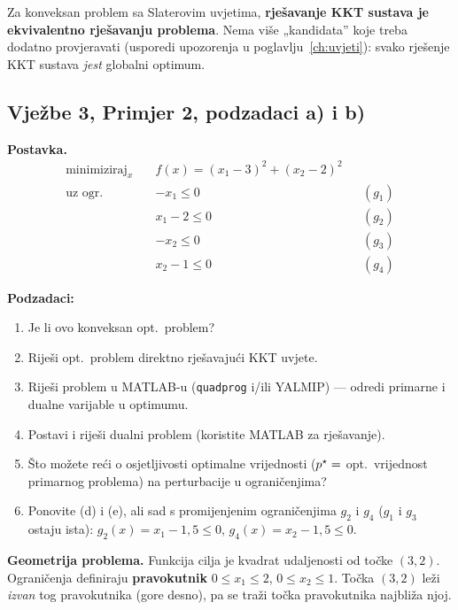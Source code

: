 \begin{napomena}
Za konveksan problem sa Slaterovim uvjetima, \textbf{rješavanje KKT sustava je
ekvivalentno rješavanju problema}. Nema više „kandidata” koje treba dodatno
provjeravati (usporedi upozorenja u poglavlju~\ref{ch:uvjeti}): svako rješenje
KKT sustava \emph{jest} globalni optimum.
\end{napomena}

\subsection{Vježbe 3, Primjer 2, podzadaci a) i b)}
\label{sec:primjer2-ab}

\begin{zadatak}
\label{zad:primjer2}

\textbf{Postavka.}
\[
\begin{aligned}
\text{minimiziraj}_x \quad & f(x) = (x_1-3)^2 + (x_2-2)^2 \\
\text{uz ogr.} \quad
& -x_1 \le 0 && (g_1) \\
& x_1 - 2 \le 0 && (g_2) \\
& -x_2 \le 0 && (g_3) \\
& x_2 - 1 \le 0 && (g_4)
\end{aligned}
\]

\textbf{Podzadaci:}
\begin{enumerate}[label=\alph*)]
  \item Je li ovo konveksan opt.\ problem?
  \item Riješi opt.\ problem direktno rješavajući KKT uvjete.
  \item Riješi problem u MATLAB-u (\texttt{quadprog} i/ili YALMIP) --- odredi
        primarne i dualne varijable u optimumu.
  \item Postavi i riješi dualni problem (koristite MATLAB za rješavanje).
  \item Što možete reći o osjetljivosti optimalne vrijednosti ($p^{\star} =$ opt.\
        vrijednost primarnog problema) na perturbacije u ograničenjima?
  \item Ponovite (d) i (e), ali sad s promijenjenim ograničenjima $g_2$ i $g_4$
        ($g_1$ i $g_3$ ostaju ista):
        $g_2(x) = x_1 - 1{,}5 \le 0$, $g_4(x) = x_2 - 1{,}5 \le 0$.
\end{enumerate}

\medskip
\textbf{Geometrija problema.} Funkcija cilja je kvadrat udaljenosti od točke
$(3,2)$. Ograničenja definiraju \textbf{pravokutnik}
$0 \le x_1 \le 2$, $0 \le x_2 \le 1$. Točka $(3,2)$ leži \emph{izvan} tog
pravokutnika (gore desno), pa se traži točka pravokutnika najbliža njoj.


\end{zadatak}

